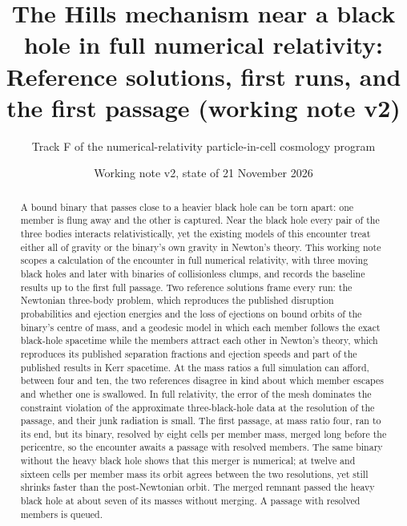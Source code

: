 \documentclass[aps,prd,twocolumn,10pt,superscriptaddress,nofootinbib,longbibliography,floatfix]{revtex4-2}
\begin{document}
\title{The Hills mechanism near a black hole in full numerical relativity:\\ Reference solutions, first runs, and the first passage (working note v2)}

\author{Track F of the numerical-relativity particle-in-cell cosmology program}

\date{Working note v2, state of 21 November 2026}

\begin{abstract}
A bound binary that passes close to a heavier black hole can be torn apart: one member is flung away and the other is captured. Near the black hole every pair of the three bodies interacts relativistically, yet the existing models of this encounter treat either all of gravity or the binary's own gravity in Newton's theory. This working note scopes a calculation of the encounter in full numerical relativity, with three moving black holes and later with binaries of collisionless clumps, and records the baseline results up to the first full passage. Two reference solutions frame every run: the Newtonian three-body problem, which reproduces the published disruption probabilities and ejection energies and the loss of ejections on bound orbits of the binary's centre of mass, and a geodesic model in which each member follows the exact black-hole spacetime while the members attract each other in Newton's theory, which reproduces its published separation fractions and ejection speeds and part of the published results in Kerr spacetime. At the mass ratios a full simulation can afford, between four and ten, the two references disagree in kind about which member escapes and whether one is swallowed. In full relativity, the error of the mesh dominates the constraint violation of the approximate three-black-hole data at the resolution of the passage, and their junk radiation is small. The first passage, at mass ratio four, ran to its end, but its binary, resolved by eight cells per member mass, merged long before the pericentre, so the encounter awaits a passage with resolved members. The same binary without the heavy black hole shows that this merger is numerical; at twelve and sixteen cells per member mass its orbit agrees between the two resolutions, yet still shrinks faster than the post-Newtonian orbit. The merged remnant passed the heavy black hole at about seven of its masses without merging. A passage with resolved members is queued.
\end{abstract}

\maketitle
\end{document}
